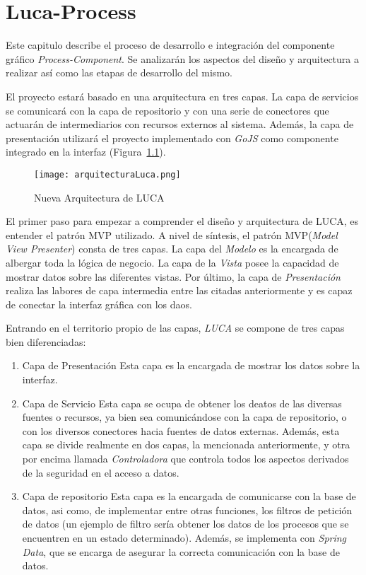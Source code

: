 \chapter{Luca-Process}
	
Este capitulo describe el proceso de desarrollo e integración del componente gráfico \emph{Process-Component}. Se analizarán los aspectos del diseño y arquitectura a realizar así como las etapas de desarrollo del mismo.
	

El proyecto estará basado en una arquitectura en tres capas. La capa de servicios se comunicará con la capa de repositorio y con una serie de conectores que actuarán de intermediarios con recursos externos al sistema. Además, la capa de presentación utilizará el proyecto implementado con \emph{GoJS} como componente integrado en la interfaz (Figura~\ref{fig:arquitecturaLuca}).

\begin{figure}[H]
	\centering
	\texttt{[image: arquitecturaLuca.png]}
	\caption{Nueva Arquitectura de LUCA}\label{fig:arquitecturaLuca}
\end{figure}


El primer paso para empezar a comprender el diseño y arquitectura de LUCA, es entender el patrón MVP\cite{mvp} utilizado.
A nivel de síntesis, el patrón MVP(\emph{Model View Presenter}) consta de tres capas. La capa del \emph{Modelo} es la encargada de albergar toda la lógica de negocio. La capa de la \emph{Vista} posee la capacidad de mostrar datos sobre las diferentes vistas. Por último, la capa de \emph{Presentación} realiza las labores de capa intermedia entre las citadas anteriormente y es capaz de conectar la interfaz gráfica con los daos.


Entrando en el territorio propio de las capas, \emph{LUCA} se compone de tres capas bien diferenciadas:

\begin{enumerate}
	\item Capa de Presentación \subitem Esta capa es la encargada de mostrar los datos sobre la interfaz.
	\item Capa de Servicio \subitem Esta capa se ocupa de obtener los deatos de las diversas fuentes o recursos, ya bien sea comunicándose con la capa de repositorio, o con los diversos conectores hacia fuentes de datos externas. Además, esta capa se divide realmente en dos capas, la mencionada anteriormente, y otra por encima llamada \emph{Controladora} que controla todos los aspectos derivados de la seguridad en el acceso a datos.
	\item Capa de repositorio \subitem Esta capa es la encargada de comunicarse con la base de datos, asi como, de implementar entre otras funciones, los filtros de petición de datos (un ejemplo de filtro sería obtener los datos de los procesos que se encuentren en un estado determinado). Además, se implementa con \emph{Spring Data}\cite{jpa}, que se encarga de asegurar la correcta comunicación con la base de datos.
\end{enumerate}



